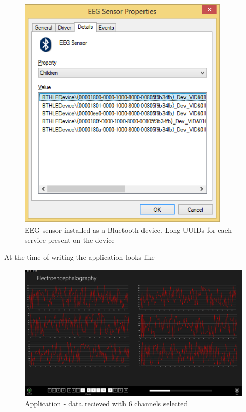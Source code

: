 \documentclass[]{article}
\begin{document}
\begin{figure}[htb]
	\begin{center}
		\includegraphics[width = 0.9\textwidth]{dvcmgr}
	\end{center}
	\caption{\ac{EEG} sensor installed as a Bluetooth device. Long UUIDs for each service present on the device}
	\label{fig:dvcmgr}
\end{figure}


At the time of writing the application looks like


\begin{figure}[htb]
	\begin{center}
		\includegraphics[width = 1.4\textwidth,angle = 90]{exampleapp}
	\end{center}
	\caption{Application - data recieved with 6 channels selected}
	\label{fig:exampleapp}
\end{figure}
\end{document}
